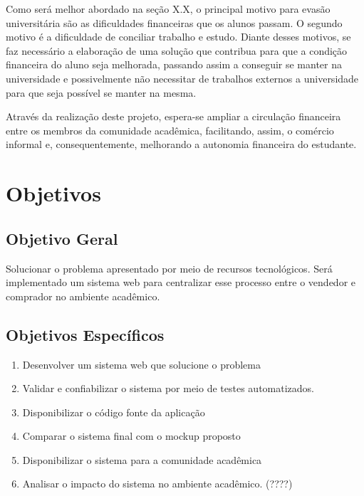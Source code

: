 Como será melhor abordado na seção X.X, o principal motivo para evasão universitária são as dificuldades financeiras que os alunos passam. O segundo motivo é a dificuldade de conciliar trabalho e estudo. Diante desses motivos, se faz necessário a elaboração de uma solução que contribua para que a condição financeira do aluno seja melhorada, passando assim a conseguir se manter na universidade e possivelmente não necessitar de trabalhos externos a universidade para que seja possível se manter na mesma.

Através da realização deste projeto, espera-se ampliar a circulação financeira entre os membros da comunidade acadêmica, facilitando, assim, o comércio informal e, consequentemente, melhorando a autonomia financeira do estudante.

\section{Objetivos}

\subsection{ Objetivo Geral}

Solucionar o problema apresentado por meio de recursos tecnológicos. Será implementado um sistema web para centralizar esse processo entre o vendedor e comprador no ambiente acadêmico.

\subsection{Objetivos Específicos}
\begin{enumerate}
    \item Desenvolver um sistema web que solucione o problema
    \item Validar e confiabilizar o sistema por meio de testes automatizados.
    \item Disponibilizar o código fonte da aplicação
    \item Comparar o sistema final com o mockup proposto
    \item Disponibilizar o sistema para a comunidade acadêmica
    \item Analisar o impacto do sistema no ambiente acadêmico. (????)
\end{enumerate}


